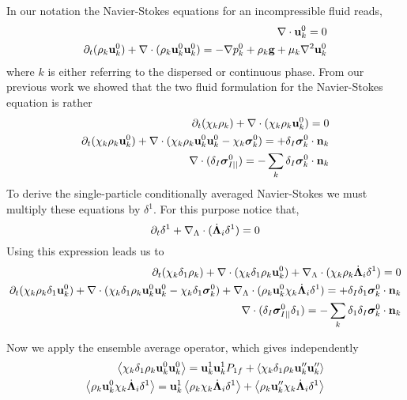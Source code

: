 \documentclass[11pt]{My_preprint}
\begin{document}
In our notation the Navier-Stokes equations for an incompressible fluid reads, 
\begin{align}
    \mathbf{\nabla}\cdot \textbf{u}_k^0  = 0 \\
    \partial_t (\rho_k \textbf{u}_k^0 )
    + \mathbf{\nabla}\cdot(\rho_k \textbf{u}_k^0  \textbf{u}_k^0 ) 
    = - \mathbf{\nabla} p_k^0 
    + \rho_k \textbf{g}
    + \mu_k \mathbf{\nabla}^2 \textbf{u}_k^0
\end{align}
where $k$ is either referring to the dispersed or continuous phase. 
From our previous work we showed that the two fluid formulation for the Navier-Stokes equation is rather 
\begin{align}
    \partial_t (\chi_k \rho_k )
    + \mathbf{\nabla}\cdot (
        \chi_k \rho_k  \textbf{u}_k^0
        )
        = 
        0 \\
        \partial_t (\chi_k \rho_k \textbf{u}_k^0)
        + \mathbf{\nabla}\cdot (
        \chi_k \rho_k \textbf{u}_k^0 \textbf{u}_k^0
        - \chi_k \bm\sigma_k^0 
        )
    = 
    + \delta_I
         \bm\sigma_k^0
    \cdot \textbf{n}_k\\
        \mathbf{\nabla}\cdot (\delta_I \bm\sigma_{I||}^0 )
        = 
        - \sum_k
        \delta_I
        \bm\sigma_k^0
   \cdot \textbf{n}_k
\end{align}
To derive the single-particle conditionally averaged Navier-Stokes we must multiply these equations by $\delta^1$. 
For this purpose notice that, 
\begin{equation}
    \partial_t \delta^1+\mathbf{\nabla}_\Lambda\cdot(\dot{\bm\Lambda}_i \delta^1 ) = 0 
\end{equation} 
Using this expression leads us to 
\begin{align}
    \partial_t (\chi_k \delta_1 \rho_k )
    + \mathbf{\nabla}\cdot (
        \chi_k  \delta_1 \rho_k  \textbf{u}_k^0
        )
    +  \mathbf{\nabla}_\Lambda \cdot (\chi_k \rho_k \dot{\bm\Lambda}_i \delta^1)
    = 
    0 \\
    \partial_t (\chi_k \rho_k \delta_1 \textbf{u}_k^0)
    + \mathbf{\nabla}\cdot (
        \chi_k\delta_1 \rho_k \textbf{u}_k^0 \textbf{u}_k^0
        - \chi_k\delta_1 \bm\sigma_k^0 
        )
    +  \mathbf{\nabla}_\Lambda \cdot ( \rho_k \textbf{u}_k^0 \chi_k \dot{\bm\Lambda}_i \delta^1)
    = 
    + \delta_I\delta_1
         \bm\sigma_k^0
    \cdot \textbf{n}_k\\
        \mathbf{\nabla}\cdot (\delta_I \bm\sigma_{I||}^0 \delta_1 )
        = 
        - \sum_k\delta_1
        \delta_I
        \bm\sigma_k^0
   \cdot \textbf{n}_k
\end{align}

Now we apply the ensemble average operator, which gives independently 
\begin{align}
    \left<\chi_k\delta_1 \rho_k \textbf{u}_k^0 \textbf{u}_k^0\right>
    = 
    \textbf{u}_k^1 \textbf{u}_k^1 P_{1f}
    + \left<\chi_k\delta_1 \rho_k \textbf{u}_k'' \textbf{u}_k''\right>\\
    \left<\rho_k \textbf{u}_k^0 \chi_k \dot{\bm\Lambda}_i \delta^1\right>
    = 
    \textbf{u}_k^1 \left<\rho_k  \chi_k \dot{\bm\Lambda}_i \delta^1\right>
    + \left<\rho_k \textbf{u}_k'' \chi_k \dot{\bm\Lambda}_i \delta^1\right>
\end{align}
\end{document}
